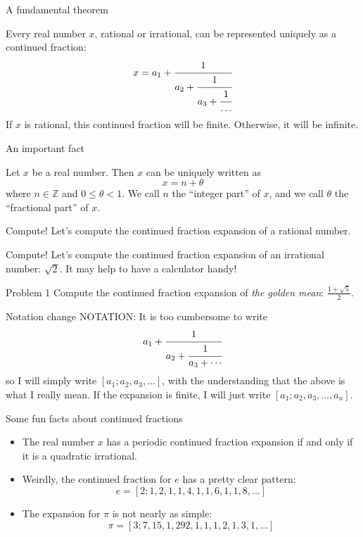 \documentclass[serif]{beamer}
\newcommand{\ZZ}{\mathbb{Z}}
\begin{document}
\begin{frame}{A fundamental theorem}
    \begin{theorem}
    Every real number $x$, rational or irrational, can be represented uniquely as a continued fraction:
    \[x = a_1 + \cfrac{1}{a_2+\cfrac{1}{a_3+\cfrac{1}{\dots}}}
    \] If $x$ is rational, this continued fraction will be finite. Otherwise, it will be infinite.
    \end{theorem}
\end{frame}

\begin{frame}{An important fact}
    \begin{theorem}
    Let $x$ be a real number. Then $x$ can be uniquely written as \[x=n+\theta\] where $n\in \ZZ$ and $0\leqslant \theta < 1$. We call $n$ the ``integer part'' of $x$, and we call $\theta$ the ``fractional part'' of $x$.
    \end{theorem}
\end{frame}

\begin{frame}{Compute!}
    Let's compute the continued fraction expansion of a rational number.
\end{frame}

\begin{frame}{Compute!}
    Let's compute the continued fraction expansion of an irrational number: $\sqrt{2}$. It may help to have a calculator handy!
\end{frame}

\begin{frame}{Problem 1}
    Compute the continued fraction expansion of \emph{the golden mean}: $\frac{1+\sqrt{5}}{2}$.
\end{frame}

\begin{frame}{Notation change}
    NOTATION: It is too cumbersome to write \[a_1+\cfrac{1}{a_2+\cfrac{1}{a_3+\cdots}}\]
    so I will simply write $[a_1;a_2,a_3,\dots]$, with the understanding that the above is what I really mean. If the expansion is finite, I will just write $[a_1;a_2,a_3,\dots,a_n]$.
\end{frame}

\begin{frame}{Some fun facts about continued fractions}
    \begin{itemize}
        \item The real number $x$ has a periodic continued fraction expansion if and only if it is a quadratic irrational.
        \item Weirdly, the continued fraction for $e$ has a pretty clear pattern:
        \[e = [2;1,2,1,1,4,1,1,6,1,1,8,\dots]\]
        \item The expansion for $\pi$ is not nearly as simple:
        \[\pi = [3;7,15,1,292, 1,1,1,2,1,3,1,\dots]\]
    \end{itemize}
\end{frame}
\end{document}
